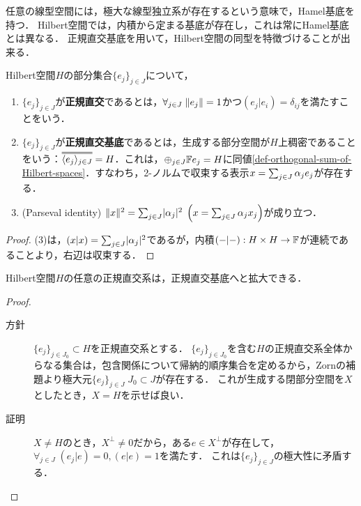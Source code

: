 \documentclass[uplatex,dvipdfmx]{jsreport}
\begin{document}
\begin{tcolorbox}[colframe=ForestGreen, colback=ForestGreen!10!white,breakable,colbacktitle=ForestGreen!40!white,coltitle=black,fonttitle=\bfseries\sffamily,
title=]
    任意の線型空間には，極大な線型独立系が存在するという意味で，Hamel基底を持つ．
    Hilbert空間では，内積から定まる基底が存在し，これは常にHamel基底とは異なる．
    正規直交基底を用いて，Hilbert空間の同型を特徴づけることが出来る．
\end{tcolorbox}

\begin{definition}
    Hilbert空間$H$の部分集合$\{e_j\}_{j\in J}$について，
    \begin{enumerate}
        \item $\{e_j\}_{j\in J}$が\textbf{正規直交}であるとは，$\forall_{j\in J}\;\|e_j\|=1$かつ$(e_j|e_i)=\delta_{ij}$を満たすことをいう．
        \item $\{e_j\}_{j\in J}$が\textbf{正規直交基底}であるとは，生成する部分空間が$H$上稠密であることをいう：$\dbloverline{\brac{e_j}_{j\in J}}=H$．これは，$\oplus_{j\in J}\mathbb{F} e_j=H$に同値\ref{def-orthogonal-sum-of-Hilbert-spaces}．すなわち，2-ノルムで収束する表示$x=\sum_{j\in J}\alpha_j e_j$が存在する．
        \item (Parseval identity) $\|x\|^2=\sum_{j\in J}\lvert\alpha_j\rvert^2\;\left(x=\sum_{j\in J}\alpha_jx_j\right)$が成り立つ．
    \end{enumerate}
\end{definition}
\begin{proof}
    (3)は，$(x|x)=\sum_{j\in J}\lvert\alpha_j\rvert^2$であるが，内積$(-|-):H\times H\to\mathbb{F}$が連続であることより，右辺は収束する．
\end{proof}

\begin{proposition}
    Hilbert空間$H$の任意の正規直交系は，正規直交基底へと拡大できる．
\end{proposition}
\begin{proof}\mbox{}
    \begin{description}
        \item[方針] $\{e_j\}_{j\in J_0}\subset H$を正規直交系とする．
        $\{e_j\}_{j\in J_0}$を含む$H$の正規直交系全体からなる集合は，包含関係について帰納的順序集合を定めるから，Zornの補題より極大元$\{e_j\}_{j\in J}\;J_0\subset J$が存在する．
        これが生成する閉部分空間を$X$としたとき，$X=H$を示せば良い．
        \item[証明] 
        $X\ne H$のとき，$X^\perp\ne 0$だから，ある$e\in X^\perp$が存在して，$\forall_{j\in J}\;(e_j|e)=0,(e|e)=1$を満たす．
        これは$\{e_j\}_{j\in J}$の極大性に矛盾する．
    \end{description}
\end{proof}
\end{document}
